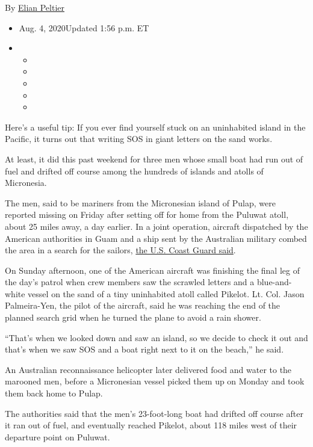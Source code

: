 By \href{https://www.nytimes3xbfgragh.onion/by/elian-peltier}{Elian
Peltier}

\begin{itemize}
\item
  Aug. 4, 2020Updated 1:56 p.m. ET
\item
  \begin{itemize}
  \item
  \item
  \item
  \item
  \item
  \end{itemize}
\end{itemize}

Here's a useful tip: If you ever find yourself stuck on an uninhabited
island in the Pacific, it turns out that writing SOS in giant letters on
the sand works.

At least, it did this past weekend for three men whose small boat had
run out of fuel and drifted off course among the hundreds of islands and
atolls of Micronesia.

The men, said to be mariners from the Micronesian island of Pulap, were
reported missing on Friday after setting off for home from the Puluwat
atoll, about 25 miles away, a day earlier. In a joint operation,
aircraft dispatched by the American authorities in Guam and a ship sent
by the Australian military combed the area in a search for the sailors,
\href{https://www.dvidshub.net/news/375188/coast-guard-partners-rescue-three-stranded-mariners-island-federated-states-micronesia}{the
U.S. Coast Guard said}.

On Sunday afternoon, one of the American aircraft was finishing the
final leg of the day's patrol when crew members saw the scrawled letters
and a blue-and-white vessel on the sand of a tiny uninhabited atoll
called Pikelot. Lt. Col. Jason Palmeira-Yen, the pilot of the aircraft,
said he was reaching the end of the planned search grid when he turned
the plane to avoid a rain shower.

``That's when we looked down and saw an island, so we decide to check it
out and that's when we saw SOS and a boat right next to it on the
beach,'' he said.

An Australian reconnaissance helicopter later delivered food and water
to the marooned men, before a Micronesian vessel picked them up on
Monday and took them back home to Pulap.

The authorities said that the men's 23-foot-long boat had drifted off
course after it ran out of fuel, and eventually reached Pikelot, about
118 miles west of their departure point on Puluwat.

